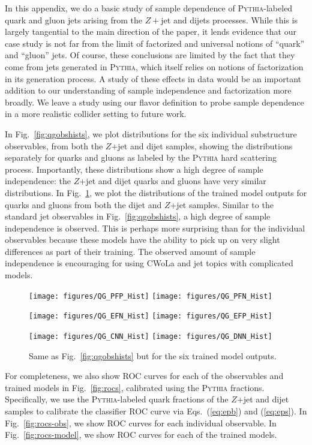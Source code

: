 \documentclass[letterpaper,11pt]{article}
\DeclareRobustCommand{\Fig}[1]{Fig.~\ref{#1}}
\DeclareRobustCommand{\Eqs}[2]{Eqs.~(\ref{#1}) and (\ref{#2})}
\newcommand{\pythia}{\textsc{Pythia}\xspace}
\begin{document}
In this appendix, we do a basic study of sample dependence of \pythia-labeled quark and gluon jets arising from the $Z+$jet and dijets processes.
%
While this is largely tangential to the main direction of the paper, it lends evidence that our case study is not far from the limit of factorized and universal notions of ``quark'' and ``gluon'' jets.
%
Of course, these conclusions are limited by the fact that they come from jets generated in \pythia, which itself relies on notions of factorization in its generation process.
%
A study of these effects in data would be an important addition to our understanding of sample independence and factorization more broadly.
%
We leave a study using our flavor definition to probe sample dependence in a more realistic collider setting to future work.


In \Fig{fig:qgobshists}, we plot distributions for the six individual substructure observables, from both the $Z$+jet and dijet samples, showing the distributions separately for quarks and gluons as labeled by the \pythia hard scattering process.
%
Importantly, these distributions show a high degree of sample independence: the $Z$+jet and dijet quarks and gluons have very similar distributions.
%
In \Fig{fig:qgmodelhists}, we plot the distributions of the trained model outputs for quarks and gluons from both the dijet and $Z$+jet samples.
%
Similar to the standard jet observables in \Fig{fig:qgobshists}, a high degree of sample independence is observed.
%
This is perhaps more surprising than for the individual observables because these models have the ability to pick up on very slight differences as part of their training.
%
The observed amount of sample independence is encouraging for using CWoLa and jet topics with complicated models.

\begin{figure}[p]
\centering
\texttt{[image: figures/QG\_PFP\_Hist]}
\texttt{[image: figures/QG\_PFN\_Hist]}

\texttt{[image: figures/QG\_EFN\_Hist]}
\texttt{[image: figures/QG\_EFP\_Hist]}

\texttt{[image: figures/QG\_CNN\_Hist]}
\texttt{[image: figures/QG\_DNN\_Hist]}
\caption{Same as \Fig{fig:qgobshists} but for the six trained model outputs.}
\label{fig:qgmodelhists}
\end{figure}


For completeness, we also show ROC curves for each of the observables and trained models in \Fig{fig:rocs}, calibrated using the \pythia fractions.
%
Specifically, we use the \pythia-labeled quark fractions of the $Z$+jet and dijet samples to calibrate the classifier ROC curve via \Eqs{eq:epb}{eq:eps}.
%
In \Fig{fig:rocs-obs}, we show ROC curves for each individual observable.
%
In \Fig{fig:rocs-model}, we show ROC curves for each of the trained models.
\end{document}
